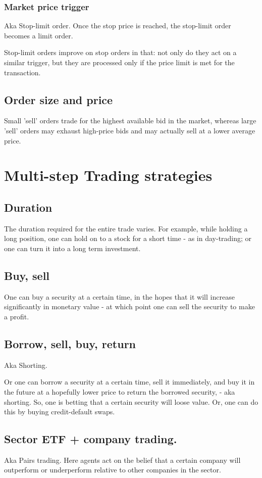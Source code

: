\documentclass[oneside, article]{memoir}
\begin{document}
\subsubsection{Market price trigger}
Aka Stop-limit order. Once the stop price is reached, the stop-limit order becomes a limit order.

Stop-limit orders improve on stop orders in that: not only do they act on a similar trigger, but they are processed only if the price limit is met for the transaction.

\subsection{Order size and price}
Small 'sell' orders trade for the highest available bid in the market, whereas large 'sell' orders may exhaust high-price bids and may actually sell at a lower average price.

\section{Multi-step Trading strategies}
\subsection{Duration}
The duration required for the entire trade varies. For example, while holding a long position, one can hold on to a stock for a short time - as in day-trading; or one can turn it into a long term investment.

\subsection{Buy, sell}
One can buy a security at a certain time, in the hopes that it will increase significantly in monetary value - at which point one can sell the security to make a profit.

\subsection{Borrow, sell, buy, return}
Aka Shorting.

Or one can borrow a security at a certain time, sell it immediately, and buy it in the future at a hopefully lower price to return the borrowed security, - aka shorting. So, one is betting that a certain security will loose value. Or, one can do this by buying credit-default swaps.

\subsection{Sector ETF + company trading.}
Aka Pairs trading. Here agents act on the belief that a certain company will outperform or underperform relative to other companies in the sector.
\end{document}
